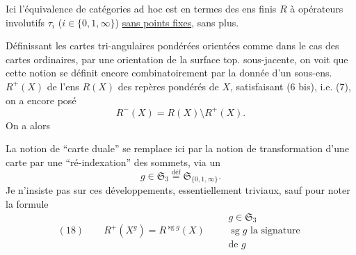 Ici l'équivalence de catégories ad hoc
est en termes des ens finis $R$ à opérateurs involutifs $\tau_i$ ($i\in\{0,1,\infty\}$) \uline{sans points fixes}, sans plus.

Définissant les cartes tri-angulaires pondérées orientées comme dans le cas des cartes ordinaires, par une orientation de la surface top. sous-jacente, on voit que cette notion se définit encore combinatoirement par la donnée d'un sous-ens. $R^+(X)$ de l'ens $R(X)$ des repères pondérés de $X$, satisfaisant (6 bis), i.e. (7),   on a encore posé
\[
R^-(X)=R(X)\setminus R^+(X).
\]
On a alors




La notion de ``carte duale'' se remplace ici par la notion de transformation d'une carte par une ``ré-indexation'' des sommets, via un
\[
g\in\mathfrak S_3\overset{\mathrm{déf}}=\mathfrak S_{\{0,1,\infty\}}.
\]
Je n'insiste pas sur ces développements, essentiellement triviaux, sauf pour noter la formule
\[
(18)\qquad R^+(X^g)=R^{\operatorname{sg}g}(X)
\qquad\begin{array}{l}g\in\mathfrak S_3\\\operatorname{sg}g\text{ la signature}\\\text{de }g\end{array}
\]

